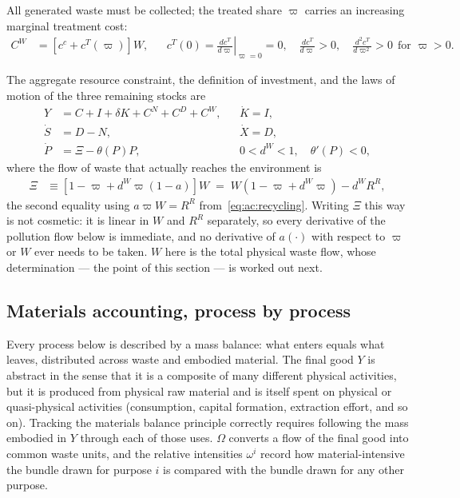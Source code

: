  All generated waste must be collected; the treated share $\varpi$ carries an increasing marginal treatment cost:
\begin{align}
C^W &= \left[c^c+c^T(\varpi)\right]W,
&&
c^T(0)=\left.\frac{dc^T}{d\varpi}\right|_{\varpi=0}=0,\quad
\frac{dc^T}{d\varpi}>0,\quad \frac{d^2c^T}{d\varpi^2}>0 \ \ \text{for }\varpi>0.
\label{eq:ac:waste-cost}
\end{align}

 The aggregate resource constraint, the definition of investment, and the laws of motion of the three remaining stocks are
\begin{align}
Y &= C+I+\delta K+C^N+C^D+C^W,
&&
\dot K = I,
\label{eq:ac:resource-constraint}
\\
\dot S &= D-N,
&&
\dot X = D,
\label{eq:ac:reserves-motion}
\\
\dot P &= \Xi-\theta(P)P,
&&
0<d^W<1,\quad \theta'(P)<0,
\label{eq:ac:pollution-motion}
\end{align}
where the flow of waste that actually reaches the environment is
\begin{align}
\Xi &\equiv \left[1-\varpi+d^W\varpi\left(1-a\right)\right]W
\;=\; W\left(1-\varpi+d^W\varpi\right)-d^WR^R,
\label{eq:ac:Xi}
\end{align}
the second equality using $a\varpi W=R^R$ from~\eqref{eq:ac:recycling}. Writing $\Xi$ this way is not cosmetic: it is linear in $W$ and $R^R$ separately, so every derivative of the pollution flow below is immediate, and no derivative of $a(\cdot)$ with respect to $\varpi$ or $W$ ever needs to be taken. $W$ here is the total physical waste flow, whose determination --- the point of this section --- is worked out next.

\subsection{Materials accounting, process by process}
\label{subsec:ac:accounting}

Every process below is described by a mass balance: what enters equals what leaves, distributed across waste and embodied material. The final good $Y$ is abstract in the sense that it is a composite of many different physical activities, but it is produced from physical raw material and is itself spent on physical or quasi-physical activities (consumption, capital formation, extraction effort, and so on). Tracking the materials balance principle correctly requires following the mass embodied in $Y$ through each of those uses. $\Omega$ converts a flow of the final good into common waste units, and the relative intensities $\omega^i$ record how material-intensive the bundle drawn for purpose $i$ is compared with the bundle drawn for any other purpose.

